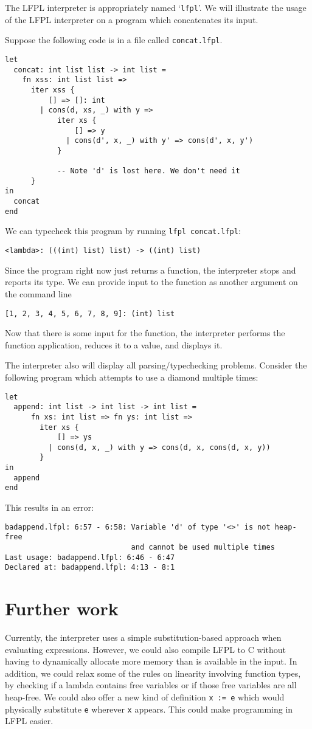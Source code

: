 \documentclass[12pt]{article}
\newcommand{\code}{\lstinline}
\begin{document}
The LFPL interpreter is appropriately named `\verb|lfpl|'. We will illustrate the usage of the LFPL interpreter on a program which concatenates its input. 

Suppose the following code is in a file called \verb|concat.lfpl|.
\begin{lstlisting}
let
  concat: int list list -> int list =
    fn xss: int list list =>
      iter xss {
          [] => []: int
        | cons(d, xs, _) with y =>
            iter xs {
                [] => y
              | cons(d', x, _) with y' => cons(d', x, y')
            }

            -- Note 'd' is lost here. We don't need it
      }
in
  concat
end 
\end{lstlisting}

We can typecheck this program by running \verb|lfpl concat.lfpl|:
\begin{lstlisting}[numbers=none]
% lfpl concat.lfpl
<lambda>: (((int) list) list) -> ((int) list)
\end{lstlisting}
Since the program right now just returns a function, the interpreter stops and reports its type. We can provide input to the function as another argument on the command line
\begin{lstlisting}[numbers=none]
% lfpl concat.lfpl "([[1,2,3]: int, [4,5,6]: int, [7,8,9]: int]: int list)"
[1, 2, 3, 4, 5, 6, 7, 8, 9]: (int) list
\end{lstlisting}
Now that there is some input for the function, the interpreter performs the function application, reduces it to a value, and displays it. 

The interpreter also will display all parsing/typechecking problems. Consider the following program which attempts to use a diamond multiple times:
\begin{lstlisting}
let
  append: int list -> int list -> int list =
      fn xs: int list => fn ys: int list =>
        iter xs {
            [] => ys
          | cons(d, x, _) with y => cons(d, x, cons(d, x, y))
        }
in
  append
end  
\end{lstlisting}
This results in an error:
\begin{lstlisting}[numbers=none]
badappend.lfpl: 6:57 - 6:58: Variable 'd' of type '<>' is not heap-free 
                             and cannot be used multiple times
Last usage: badappend.lfpl: 6:46 - 6:47
Declared at: badappend.lfpl: 4:13 - 8:1  
\end{lstlisting}

\section{Further work}
Currently, the interpreter uses a simple substitution-based approach when evaluating expressions. However, we could also compile LFPL to C without having to dynamically allocate more memory than is available in the input. In addition, we could relax some of the rules on linearity involving function types, by checking if a lambda contains free variables or if those free variables are all heap-free. We could also offer a new kind of definition \code|x := e| which would physically substitute \code|e| wherever \code|x| appears. This could make programming in LFPL easier. 
\end{document}
